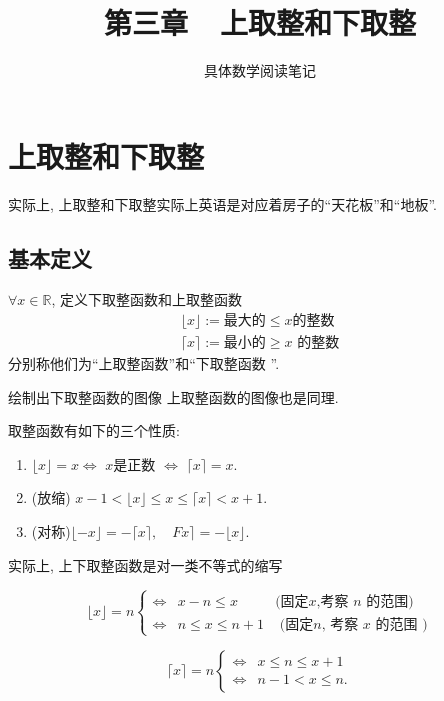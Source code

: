 \documentclass{ctexart}
\title{第三章~~上取整和下取整}
\author{具体数学阅读笔记}
\begin{document}
\maketitle

\section{上取整和下取整} 
\label{sec:intro}

实际上, 上取整和下取整实际上英语是对应着房子的``天花板''和``地板''. 


\subsection{基本定义} 

\begin{definition}[上取整和下取整]
    $\forall x \in \mathbb{R}$, 定义下取整函数和上取整函数
    \begin{align*}
    \lfloor x\rfloor:= \text{最大的} \leqslant x \text{的整数}\\
    \lceil x\rceil := \text{最小的} \geqslant x\text{ 的整数}
    \end{align*}
    分别称他们为``上取整函数''和``下取整函数 ''.
    
\end{definition}

\begin{example}绘制出下取整函数的图像
   上取整函数的图像也是同理.  
\end{example}

\begin{prop}
    取整函数有如下的三个性质: 

    \begin{enumerate}
        \item $\lfloor x\rfloor=x \iff$ $x$是正数 $\iff $ $\lceil x\rceil=x$.
        \item (放缩) $x-1<\lfloor x\rfloor \leqslant x \leqslant\lceil x\rceil<x+1$.
        \item (对称)$\lfloor-x\rfloor=-\lceil x\rceil, \quad F x\rceil=-\lfloor x\rfloor$.
    \end{enumerate}
    
\end{prop}

\begin{prop}
    实际上, 上下取整函数是对一类不等式的缩写

    $$
\lfloor x\rfloor=n\left\{\begin{array}{lll}
    \iff & x-n \leqslant x & \text {(固定}x\text{,考察 } n \text { 的范围) } \\
\iff & n \leqslant x \leqslant n+1 & \text { (固定}n\text{, 考察 } x \text { 的范围 })
\end{array}\right.
$$

$$
\lceil x\rceil=n \begin{cases}\iff & x \leqslant n \leqslant x+1 \\ \iff & n-1<x \leqslant n .\end{cases}
$$

    
\end{prop}
\end{document}
